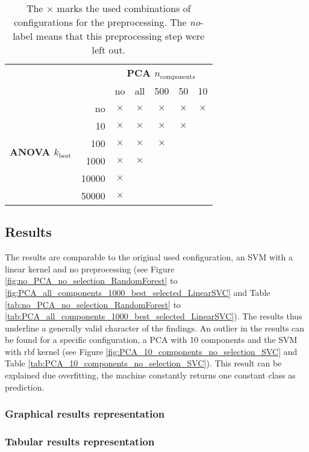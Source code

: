     \begin{table}[!htp]
        \begin{center}

            \begin{tabular}{rr|ccccc}
                & & \multicolumn{5}{c}{\textbf{PCA $n_\text{components}$}}\\
                & & no & all & \num{500} & \num{50} & \num{10} \\
                \cline{2-7}
                \multirow{6}{*}{{\textbf{ANOVA $k_\text{best}$}}} & no & $\times$ & $\times$ & $\times$ & $\times$ & $\times$ \\
                & \num{10} & $\times$ & $\times$ & $\times$ & $\times$ &   \\
                & \num{100} & $\times$ & $\times$ & $\times$ & &   \\
                & \num{1000} & $\times$ & $\times$ & & &   \\
                & \num{10000} & $\times$ & & & &   \\
                & \num{50000} & $\times$ & & & &   \\

            \end{tabular}
            \caption[Configurations for the preprocessing]{The $\times$ marks the used combinations of configurations for the preprocessing. The \emph{no}-label means that this preprocessing step were left out.}
            \label{tab:preprocessing}
        \end{center}
    \end{table}

    \FloatBarrier

    \subsection{Results}
    \label{cha:alternative_machine_configuration_results}
    The results are comparable to the original used configuration, an SVM with a linear kernel and no preprocessing (see Figure \ref{fig:no_PCA_no_selection_RandomForest} to \ref{fig:PCA_all_components_1000_best_selected_LinearSVC} and Table \ref{tab:no_PCA_no_selection_RandomForest} to \ref{tab:PCA_all_components_1000_best_selected_LinearSVC}). The results thus underline a generally valid character of the findings.
    An outlier in the results can be found for a specific configuration, a PCA with 10 components and the SVM with rbf kernel (see Figure \ref{fig:PCA_10_components_no_selection_SVC} and Table \ref{tab:PCA_10_components_no_selection_SVC}). This result can be explained due overfitting, the machine constantly returns one constant class as prediction.
    \FloatBarrier

    \subsubsection{Graphical results representation}

    

    \FloatBarrier

    \subsubsection{Tabular results representation}
    


